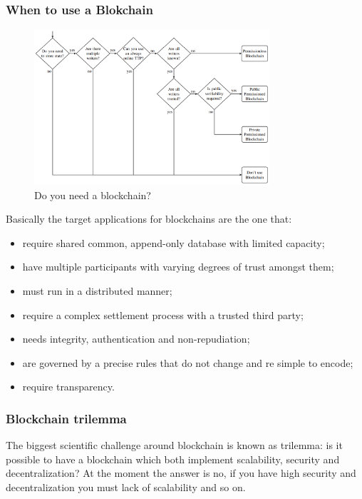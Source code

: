 \subsubsection{When to use a Blokchain}
\begin{figure}[H]
    \centering
    \includegraphics[width=330px]{images/1_Introduction/01.png}
    \caption{Do you need a blockchain?}
    \label{fig:enter-label}
\end{figure}

Basically the target applications for blockchains are the one that:
\begin{itemize}
    \item require shared common, append-only database with limited capacity;
    \item have multiple participants with varying degrees of trust amongst them;
    \item must run in a distributed manner;
    \item require a complex settlement process with a trusted third party;
    \item needs integrity, authentication and non-repudiation;
    \item are governed by a precise rules that do not change and re simple to encode;
    \item require transparency.
\end{itemize}

\subsubsection{Blockchain trilemma}
The biggest scientific challenge around blockchain is known as trilemma: is it possible to have a blockchain which both implement scalability, security and decentralization?
At the moment the answer is no, if you have high security and decentralization you must lack of scalability and so on.



